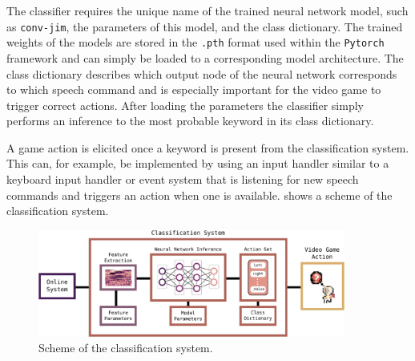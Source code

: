 The classifier requires the unique name of the trained neural network model, such as \texttt{conv-jim}, the parameters of this model, and the class dictionary.
The trained weights of the  models are stored in the \texttt{.pth} format used within the \texttt{Pytorch} framework and can simply be loaded to a corresponding model architecture.
The class dictionary describes which output node of the neural network corresponds to which speech command and is especially important for the video game to trigger correct actions.
After loading the parameters the classifier simply performs an inference to the most probable keyword in its class dictionary.

A game action is elicited once a keyword is present from the classification system.
This can, for example, be implemented by using an input handler similar to a keyboard input handler or event system that is listening for new speech commands and triggers an action when one is available.
 shows a scheme of the classification system.
\begin{figure}[!ht]
  \centering
  \includegraphics[width=0.9\textwidth]{./6_game/figs/game_system_classification.pdf}
  \caption{Scheme of the classification system.}
  \label{fig:game_system_classification}
\end{figure}
\FloatBarrier
\noindent

